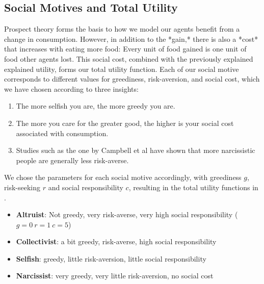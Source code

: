 \subsection{Social Motives and Total Utility}

Prospect theory forms the basis to how we model our agents benefit from a change in consumption. However, in addition to the *gain,* there is also a *cost* that increases with eating more food: Every unit of food gained is one unit of food other agents lost. This social cost, combined with the previously explained explained utility, forms our total utility function. Each of our social motive corresponds to different values for greediness, risk-aversion, and social cost, which we have chosen according to three insights:

\begin{enumerate}
    \item The more selfish you are, the more greedy you are.
    
    \item The more you care for the greater good, the higher is your social cost associated with consumption.
    
    \item Studies such as the one by Campbell et al have shown that more narcissistic people are generally less risk-averse.
    \cite{campbell2004narcissism}
\end{enumerate}

We chose the parameters for each social motive accordingly, with greediness $g$, risk-seeking $r$ and social responsibility $c$, resulting in the total utility functions in .

\begin{itemize}
    \item \textbf{Altruist}: Not greedy, very risk-averse, very high social responsibility ($g=0 \: r=1 \: c=5$)
    
    \item \textbf{Collectivist}: a bit greedy, risk-averse, high social responsibility
    
    \item \textbf{Selfish}: greedy, little risk-aversion, little social responsibility
    
    \item \textbf{Narcissist}: very greedy, very little risk-aversion, no social cost
\end{itemize}

\label{fig:utilities}


